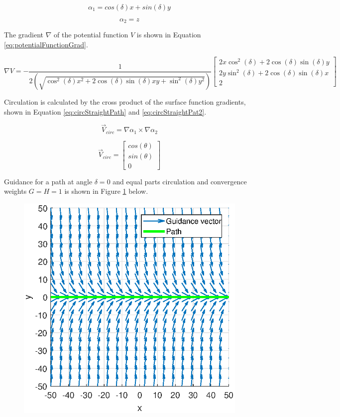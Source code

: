 \documentclass[conf]{new-aiaa}
\begin{document}
\begin{equation}
\label{eq:pathFunction}
\alpha_1 = cos(\delta)x + sin(\delta)y
\end{equation}

\begin{equation}
\label{eq:pathFunctionZ}
\alpha_2 = z
\end{equation}

The gradient $\nabla$ of the potential function $V$ is shown in Equation \ref{eq:potentialFunctionGrad}.

\begin{equation}
\label{eq:potentialFunctionGrad}
\nabla V = -\frac{1}{2(\sqrt{\cos^2(\delta) x^2+2\cos(\delta)\sin(\delta) xy +\sin^2 (\delta) y^2})} \begin{bmatrix}
2x\cos^2(\delta) + 2\cos(\delta)\sin(\delta) y \\
2y\sin^2(\delta) + 2\cos(\delta)\sin(\delta) x \\
2
\end{bmatrix}
\end{equation}

Circulation is calculated by the cross product of the surface function gradients, shown in Equation \ref{eq:circStraightPath} and \ref{eq:circStraightPat2}.


\begin{equation}
\overrightarrow{V}_{circ} =  \nabla \alpha_1 \times \nabla \alpha_2 
\label{eq:circStraightPath}
\end{equation}


\begin{equation}
\label{eq:circStraightPat2}
\overrightarrow{V}_{circ} = \begin{bmatrix}
cos(\theta) \\
sin(\theta) \\
0
\end{bmatrix}
\end{equation}

Guidance for a path at angle $\delta = 0$ and equal parts circulation and convergence weights $G=H=1$ is shown in Figure \ref{fig:straightpath} below.

\begin{figure}[H]
	\centering
	\includegraphics[width=0.7\linewidth]{Figures/methods/straightPath}
	\caption{}
	\label{fig:straightpath}
\end{figure}
\end{document}
